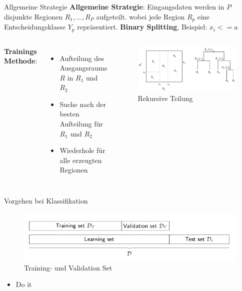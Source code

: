 \documentclass{beamer}
\begin{document}
\begin{frame}{Allgemeine Strategie}
	\textbf{Allgemeine Strategie}: Eingangsdaten werden in $P$ disjunkte Regionen $R_1,\dots,R_P$ aufgeteilt. 
	wobei jede Region $R_p$ eine Entscheidungsklasse $Y_p$ repräsentiert. 
 \textbf{Binary Splitting}, Beispiel: $x_i <= a$ \vspace{0.25cm}
	
	\begin{columns}
				\textbf{Trainings Methode}:
				\begin{itemize}
					\item {Aufteilung des Ausgangsraums $R$ in $R_1$ und $R_2$}
					\item{Suche nach der besten Aufteilung für $R_1$ und $R_2$}
					\item{Wiederhole für alle erzeugten Regionen}
				\end{itemize}
			
			\begin{figure}
				\includegraphics[width=\linewidth]{Images/split.png}
				\caption{Rekursive Teilung \cite{hastie_tibshirani_friedman}}
			\end{figure}
	\end{columns}
\end{frame}

\begin{frame}{Vorgehen bei Klassifikation}
	
	\begin{figure}
		\includegraphics[width=\linewidth]{Images/training.png}
		\caption{Training- und Validation Set \cite{machine-leanring}}
	\end{figure}
	
	\begin{itemize}
		\item Do it
	\end{itemize}

\end{frame}
\end{document}
